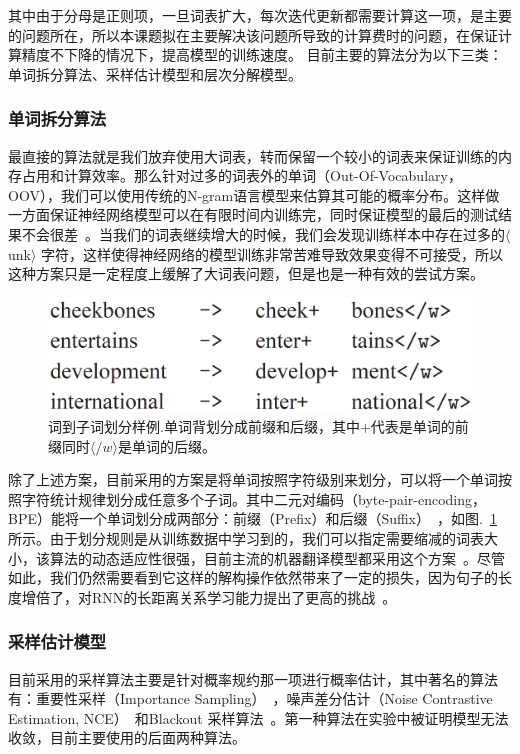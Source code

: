 \documentclass[master,openright,twoside,color]{buaathesis}
\begin{document}
其中由于分母是正则项，一旦词表扩大，每次迭代更新都需要计算这一项，是主要的问题所在，所以本课题拟在主要解决该问题所导致的计算费时的问题，在保证计算精度不下降的情况下，提高模型的训练速度。 目前主要的算法分为以下三类： 单词拆分算法、采样估计模型和层次分解模型。


\subsubsection{单词拆分算法}
最直接的算法就是我们放弃使用大词表，转而保留一个较小的词表来保证训练的内存占用和计算效率。那么针对过多的词表外的单词（Out-Of-Vocabulary，OOV），我们可以使用传统的N-gram语言模型来估算其可能的概率分布。这样做一方面保证神经网络模型可以在有限时间内训练完，同时保证模型的最后的测试结果不会很差~。当我们的词表继续增大的时候，我们会发现训练样本中存在过多的$\langle$unk$\rangle$ 字符，这样使得神经网络的模型训练非常苦难导致效果变得不可接受，所以这种方案只是一定程度上缓解了大词表问题，但是也是一种有效的尝试方案。

\begin{figure}
  \centering
\includegraphics[width=0.6\linewidth]{./figures/subword.png}
\caption{词到子词划分样例.单词背划分成前缀和后缀，其中$+$代表是单词的前缀同时$\langle /w \rangle$是单词的后缀。}\label{fig:subword}
\end{figure}
除了上述方案，目前采用的方案是将单词按照字符级别来划分，可以将一个单词按照字符统计规律划分成任意多个子词。其中二元对编码（byte-pair-encoding，BPE）能将一个单词划分成两部分：前缀（Prefix）和后缀（Suffix）~，如图.~\ref{fig:subword} 所示。由于划分规则是从训练数据中学习到的，我们可以指定需要缩减的词表大小，该算法的动态适应性很强，目前主流的机器翻译模型都采用这个方案~。尽管如此，我们仍然需要看到它这样的解构操作依然带来了一定的损失，因为句子的长度增倍了，对RNN的长距离关系学习能力提出了更高的挑战~。

\subsubsection{采样估计模型}
目前采用的采样算法主要是针对概率规约那一项进行概率估计，其中著名的算法有：重要性采样（Importance Sampling）~，噪声差分估计（Noise Contrastive Estimation, NCE）~和Blackout 采样算法~。第一种算法在实验中被证明模型无法收敛，目前主要使用的后面两种算法。
\end{document}
